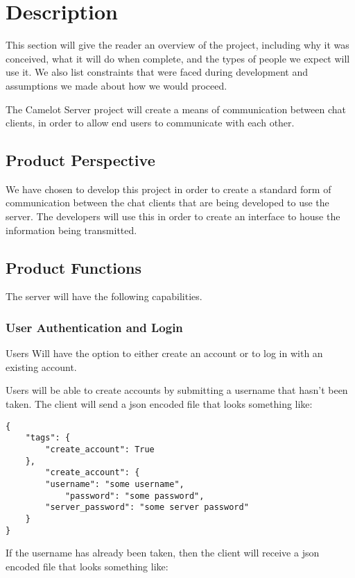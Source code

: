 \chapter{Description}\label{description}
This section will give the reader an overview of the project, including why it was conceived, what it will do when complete, and the types of people we expect will use it. We also list constraints that were faced during development and assumptions we made about how we would proceed.

The Camelot Server project will create a means of communication between chat clients, in order to allow end users to communicate with each other.

\section{Product Perspective}\label{product-perspective}
We have chosen to develop this project in order to create a standard form of communication between the chat clients that are being developed to use the server. The developers will use this in order to create an interface to house the information being transmitted.

\section{Product Functions}\label{product-functions}
The server will have the following capabilities.

\subsection{User Authentication and Login}
Users Will have the option to either create an account or to log in with an existing account.

Users will be able to create accounts by submitting a username that hasn't been taken. The client will send a \gls{json} encoded file that looks something like:

\begin{lstlisting}[style=json]
{
    "tags": {
        "create_account": True
    },
        "create_account": {
        "username": "some username",
            "password": "some password",
        "server_password": "some server password"
    }
}
\end{lstlisting}

If the username has already been taken, then the client will receive a \gls{json} encoded file that looks something like:

